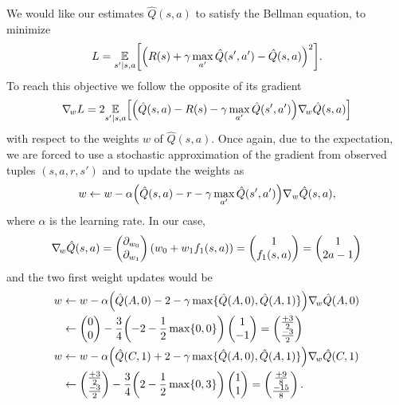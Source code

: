 \documentclass[11pt, a4paper]{article}
\begin{document}
\begin{enumerate}
    \begin{solution}
        We would like our estimates $\hat{Q}(s, a)$ to satisfy the
        Bellman equation, \ie{} to minimize
        \begin{equation*}
            L = \underset{s' | s, a}{\E} \sbk*{\rbk*{R(s) + \gamma \max_{a'} \hat{Q}(s', a') - \hat{Q}(s, a)}^2} .
        \end{equation*}
        To reach this objective we follow the opposite of its gradient
        \begin{equation*}
            \nabla_{\!w} L = 2 \underset{s' | s, a}{\E} \sbk*{\rbk*{\hat{Q}(s, a) - R(s) - \gamma \max_{a'} \hat{Q}(s', a')} \nabla_{\!w} \hat{Q}(s, a)}
        \end{equation*}
        with respect to the weights\footnotemark{} $w$ of $\hat{Q}(s, a)$. Once again, due to the expectation, we are forced to use a stochastic approximation of the gradient from observed tuples $(s, a, r, s')$ and to update the weights as
        \begin{equation*}
            w \gets w - \alpha \rbk*{\hat{Q}(s, a) - r - \gamma \max_{a'} \hat{Q}(s', a')} \nabla_w \hat{Q}(s, a) ,
        \end{equation*}
        where $\alpha$ is the learning rate. In our case,
        \begin{equation*}
            \nabla_{\!w} \hat{Q}(s, a) = \begin{pmatrix}\partial_{w_0} \\ \partial_{w_1} \end{pmatrix} (w_0 + w_1 f_1(s, a)) = \begin{pmatrix} 1 \\ f_1(s, a)\end{pmatrix} = \begin{pmatrix}1 \\ 2 a - 1\end{pmatrix}
        \end{equation*}
        and the two first weight updates would be
        \begin{align*}
            w & \gets w - \alpha \rbk*{\hat{Q}(A, 0) - 2 - \gamma \max \cbk{\hat{Q}(A, 0), \hat{Q}(A, 1)}} \nabla_{\!w} \hat{Q}(A, 0) \\
            & \gets \mat{0 \\ 0} - \frac{3}{4} \rbk*{-2 - \frac{1}{2} \max\cbk{0, 0}} \mat{1 \\ -1} = \mat{\frac{+3}{2} \\ \frac{-3}{2}} \\
            w & \gets w - \alpha \rbk*{\hat{Q}(C, 1) + 2 - \gamma \max \cbk{\hat{Q}(A, 0), \hat{Q}(A, 1)}} \nabla_{\!w} \hat{Q}(C, 1) \\
            & \gets \mat{\frac{+3}{2} \\ \frac{-3}{2}} - \frac{3}{4} \rbk*{2 - \frac{1}{2} \max\cbk{0, 3}} \mat{1 \\ 1} = \mat{\frac{+9}{8} \\ \frac{-15}{8}} .
        \end{align*}


\end{solution}
\end{enumerate}
\end{document}
